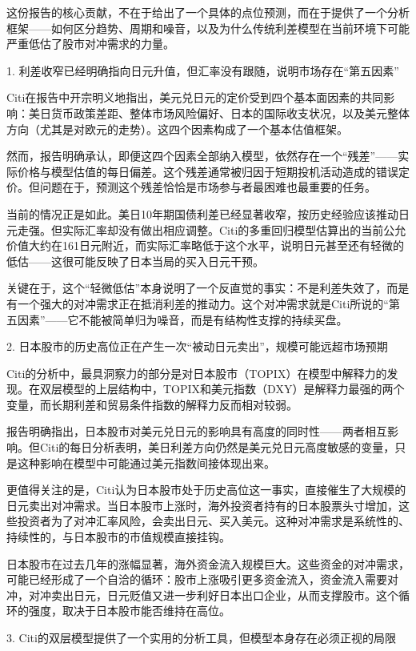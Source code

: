 \documentclass[11pt]{ctexart}
\begin{document}
这份报告的核心贡献，不在于给出了一个具体的点位预测，而在于提供了一个分析框架——如何区分趋势、周期和噪音，以及为什么传统利差模型在当前环境下可能严重低估了股市对冲需求的力量。

1. 利差收窄已经明确指向日元升值，但汇率没有跟随，说明市场存在“第五因素”

Citi在报告中开宗明义地指出，美元兑日元的定价受到四个基本面因素的共同影响：美日货币政策差距、整体市场风险偏好、日本的国际收支状况，以及美元整体方向（尤其是对欧元的走势）。这四个因素构成了一个基本估值框架。

然而，报告明确承认，即便这四个因素全部纳入模型，依然存在一个“残差”——实际价格与模型估值的每日偏差。这个残差通常被归因于短期投机活动造成的错误定价。但问题在于，预测这个残差恰恰是市场参与者最困难也最重要的任务。

当前的情况正是如此。美日10年期国债利差已经显著收窄，按历史经验应该推动日元走强。但实际汇率却没有做出相应调整。Citi的多重回归模型估算出的当前公允价值大约在161日元附近，而实际汇率略低于这个水平，说明日元甚至还有轻微的低估——这很可能反映了日本当局的买入日元干预。

关键在于，这个“轻微低估”本身说明了一个反直觉的事实：不是利差失效了，而是有一个强大的对冲需求正在抵消利差的推动力。这个对冲需求就是Citi所说的“第五因素”——它不能被简单归为噪音，而是有结构性支撑的持续买盘。

2. 日本股市的历史高位正在产生一次“被动日元卖出”，规模可能远超市场预期

Citi的分析中，最具洞察力的部分是对日本股市（TOPIX）在模型中解释力的发现。在双层模型的上层结构中，TOPIX和美元指数（DXY）是解释力最强的两个变量，而长期利差和贸易条件指数的解释力反而相对较弱。

报告明确指出，日本股市对美元兑日元的影响具有高度的同时性——两者相互影响。但Citi的每日分析表明，美日利差方向仍然是美元兑日元高度敏感的变量，只是这种影响在模型中可能通过美元指数间接体现出来。

更值得关注的是，Citi认为日本股市处于历史高位这一事实，直接催生了大规模的日元卖出对冲需求。当日本股市上涨时，海外投资者持有的日本股票头寸增加，这些投资者为了对冲汇率风险，会卖出日元、买入美元。这种对冲需求是系统性的、持续性的，与日本股市的市值规模直接挂钩。

日本股市在过去几年的涨幅显著，海外资金流入规模巨大。这些资金的对冲需求，可能已经形成了一个自洽的循环：股市上涨吸引更多资金流入，资金流入需要对冲，对冲卖出日元，日元贬值又进一步利好日本出口企业，从而支撑股市。这个循环的强度，取决于日本股市能否维持在高位。

3. Citi的双层模型提供了一个实用的分析工具，但模型本身存在必须正视的局限
\end{document}
